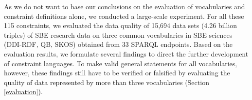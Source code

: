 \documentclass[conference]{IEEEtran}
\begin{document}
As we do not want to base our conclusions on the evaluation of vocabularies and constraint definitions alone, we conducted a large-scale experiment.
For all these 115 constraints, we evaluated the data quality of 15,694 data sets (4.26 billion triples) of SBE research data on three common vocabularies in SBE sciences (DDI-RDF, QB, SKOS) obtained from 33 SPARQL endpoints.
Based on the evaluation results,
we formulate several findings to direct the further development of constraint languages.
To make valid general statements for all vocabularies, however,
these findings still have to be verified or falsified
by evaluating the quality of data represented by more than three vocabularies (Section \ref{evaluation}).
\end{document}
